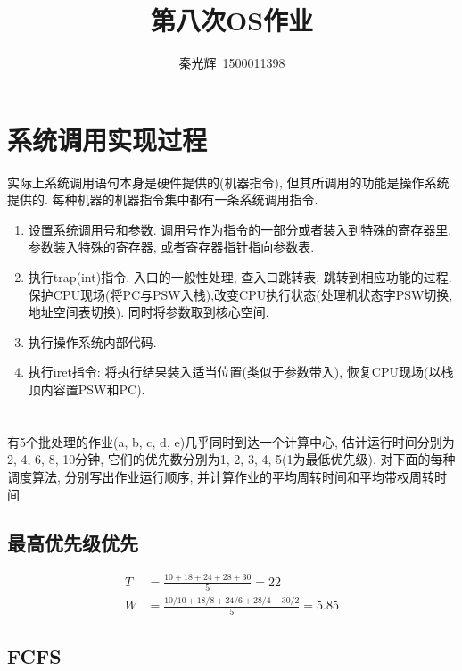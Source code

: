 \documentclass[a4paper, 12pt, notitlepage]{article}
\begin{document}
\title{第八次OS作业}
\author{秦光辉\ 1500011398}
\maketitle

\section{系统调用实现过程}

	实际上系统调用语句本身是硬件提供的(机器指令), 但其所调用的功能是操作系统提供的. 每种机器的机器指令集中都有一条系统调用指令. \\
	
\begin{enumerate}
	\item 设置系统调用号和参数. 调用号作为指令的一部分或者装入到特殊的寄存器里. 参数装入特殊的寄存器, 或者寄存器指针指向参数表. 
	\item 执行trap(int)指令. 入口的一般性处理, 查入口跳转表, 跳转到相应功能的过程. 保护CPU现场(将PC与PSW入栈),改变CPU执行状态(处理机状态字PSW切换,地址空间表切换). 同时将参数取到核心空间.
	\item 执行操作系统内部代码. 
	\item 执行iret指令: 将执行结果装入适当位置(类似于参数带入), 恢复CPU现场(以栈顶内容置PSW和PC).
\end{enumerate}

\section{ }

	有5个批处理的作业(a, b, c, d, e)几乎同时到达一个计算中心, 估计运行时间分别为2, 4, 6, 8, 10分钟, 它们的优先数分别为1, 2, 3, 4, 5(1为最低优先级). 对下面的每种调度算法, 分别写出作业运行顺序, 并计算作业的平均周转时间和平均带权周转时间

\subsection{最高优先级优先}

\begin{align*}
	T &= \frac{10 + 18 + 24 + 28 + 30}{5} = 22 \\
	W &= \frac{10/10 + 18/8 + 24/6 + 28/4 + 30/2}{5} = 5.85
\end{align*}

\subsection{FCFS}
\end{document}
